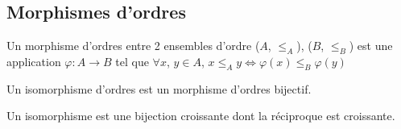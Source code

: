 \subsection{Morphismes d'ordres}

\begin{definition}

	Un morphisme d'ordres entre 2 ensembles d'ordre ($A$, $\leqslant_A$), ($B$, $\leqslant_B$) est une application $\varphi : A \to B$
	tel que $\forall x$, $y\in A$, $x \leqslant_A y \iff \varphi(x) \leqslant_B \varphi(y)$

\end{definition}

\begin{definition}
	Un isomorphisme d'ordres est un morphisme d'ordres bijectif.
\end{definition}

\begin{remarque}
	Un isomorphisme est une bijection croissante dont la réciproque est croissante.
\end{remarque}

